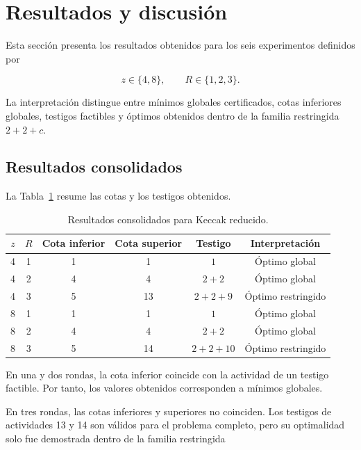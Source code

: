 ﻿\section{Resultados y discusión}
\label{sec:resultados_discusion}

Esta sección presenta los resultados obtenidos para los seis experimentos
definidos por

\[
z \in \{4,8\},
\qquad
R \in \{1,2,3\}.
\]

La interpretación distingue entre mínimos globales certificados, cotas
inferiores globales, testigos factibles y óptimos obtenidos dentro de la
familia restringida $2+2+c$.


\subsection{Resultados consolidados}
\label{subsec:resultados_consolidados}

La Tabla~\ref{tab:resultados_consolidados} resume las cotas y los testigos
obtenidos.

\begin{table}[htbp]
    \centering
    \caption{Resultados consolidados para Keccak reducido.}
    \label{tab:resultados_consolidados}
    \begin{tabular}{cccccc}
        \hline
        $z$
        &
        $R$
        &
        Cota inferior
        &
        Cota superior
        &
        Testigo
        &
        Interpretación
        \\
        \hline
        4 & 1 & 1 & 1 & $1$       & Óptimo global \\
        4 & 2 & 4 & 4 & $2+2$     & Óptimo global \\
        4 & 3 & 5 & 13 & $2+2+9$  & Óptimo restringido \\
        8 & 1 & 1 & 1 & $1$       & Óptimo global \\
        8 & 2 & 4 & 4 & $2+2$     & Óptimo global \\
        8 & 3 & 5 & 14 & $2+2+10$ & Óptimo restringido \\
        \hline
    \end{tabular}
\end{table}

En una y dos rondas, la cota inferior coincide con la actividad de un
testigo factible. Por tanto, los valores obtenidos corresponden a mínimos
globales.

En tres rondas, las cotas inferiores y superiores no coinciden. Los
testigos de actividades 13 y 14 son válidos para el problema completo,
pero su optimalidad solo fue demostrada dentro de la familia restringida


